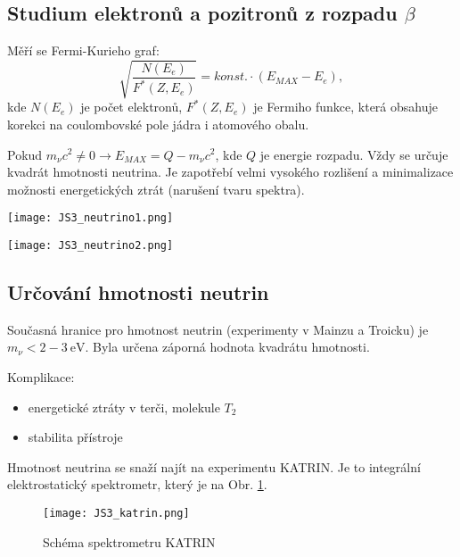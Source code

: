 \documentclass[../../main.tex]{subfiles}
\begin{document}
\subsection{Studium elektronů a pozitronů z rozpadu $\beta$}

Měří se Fermi-Kurieho graf:
\begin{equation}
\sqrt{\dfrac{N(E_e)}{F^* (Z, E_e)}} = konst. \cdotp (E_{MAX} - E_e),
\end{equation}
kde $N(E_e)$ je počet elektronů, $F^* (Z,E_e)$ je Fermiho funkce, která obsahuje korekci na coulombovské pole jádra i atomového obalu.

Pokud $m_{\nu} c^2 \neq 0 \rightarrow E_{MAX} = Q - m_{\nu}c^2$, kde $Q$ je energie rozpadu. Vždy se určuje kvadrát hmotnosti neutrina. Je zapotřebí velmi vysokého rozlišení a minimalizace možnosti energetických ztrát (narušení tvaru spektra).

\begin{center}
	\texttt{[image: JS3\_neutrino1.png]}
\end{center}

\begin{center}
	\texttt{[image: JS3\_neutrino2.png]}
\end{center}

\subsection{Určování hmotnosti neutrin}

Současná hranice pro hmotnost neutrin (experimenty v Mainzu a Troicku) je $m_{\nu} < 2 - 3 ~\mathrm{eV}$. Byla určena záporná hodnota kvadrátu hmotnosti.

Komplikace:
\begin{itemize}
	\item energetické ztráty v terči, molekule $T_2$ 
	\item stabilita přístroje
\end{itemize}	 

Hmotnost neutrina se snaží najít na experimentu KATRIN. Je to integrální elektrostatický spektrometr, který je na Obr. \ref{js3:obr:JS3_katrin}.

\begin{figure}[h]
	\centering
	\texttt{[image: JS3\_katrin.png]}
	\caption{Schéma spektrometru KATRIN \label{js3:obr:JS3_katrin}}		
\end{figure}
\end{document}
